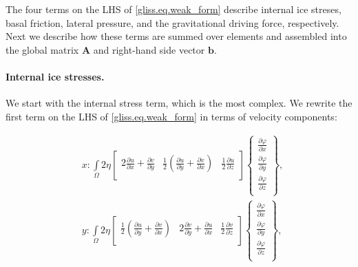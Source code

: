 The four terms on the LHS of \eqref{gliss.eq.weak_form} describe internal ice streses, basal friction, lateral pressure,
and the gravitational driving force, respectively.  Next we describe how these terms are summed over elements
and assembled into the global matrix $\mathbf{A}$ and right-hand side vector $\mathbf{b}$.

\paragraph{Internal ice stresses.}

We start with the internal stress term, which is the most complex.
We rewrite the first term on the LHS of \eqref{gliss.eq.weak_form} in terms of velocity components:

\begin{equation}
  \label{gliss.eq.weak_form_velo}
  \begin{aligned}
    & x: \int\limits_{\Omega }{2\eta \left[ \begin{matrix}
          2\frac{\partial u}{\partial x}+\frac{\partial v}{\partial y} & \frac{1}{2}\left( \frac{\partial u}{\partial y}+\frac{\partial v}{\partial x} \right) & \frac{1}{2}\frac{\partial u}{\partial z}  \\
\end{matrix} \right]}\left\{ \begin{matrix}
      \frac{\partial \varphi }{\partial x}  \\[6pt]
      \frac{\partial \varphi }{\partial y}  \\[6pt]
      \frac{\partial \varphi }{\partial z}  \\
    \end{matrix} \right\},  \\
    & y: \int\limits_{\Omega }{2\eta \left[ \begin{matrix}
          \frac{1}{2}\left( \frac{\partial u}{\partial y}+\frac{\partial v}{\partial x} \right) & 2\frac{\partial v}{\partial y}+\frac{\partial u}{\partial x} & \frac{1}{2}\frac{\partial v}{\partial z}  \\
        \end{matrix} \right]}\left\{ \begin{matrix}
      \frac{\partial \varphi }{\partial x}  \\[6pt]
      \frac{\partial \varphi }{\partial y}  \\[6pt]
      \frac{\partial \varphi }{\partial z}  \\
    \end{matrix} \right\},  \\
  \end{aligned}
\end{equation}

